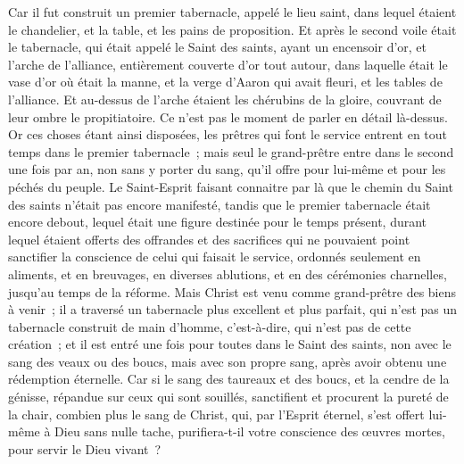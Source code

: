 \begin{multicols}{2}
Car il fut construit un premier tabernacle, appelé le lieu saint, dans lequel étaient le chandelier, et la table, et les pains de proposition.
Et après le second voile était le tabernacle, qui était appelé le Saint des saints,
ayant un encensoir d'or, et l'arche de l'alliance, entièrement couverte d'or tout autour, dans laquelle était le vase d'or où était la manne, et la verge d'Aaron qui avait fleuri, et les tables de l'alliance.
Et au-dessus de l'arche étaient les chérubins de la gloire, couvrant de leur ombre le propitiatoire. Ce n'est pas le moment de parler en détail là-dessus.
Or ces choses étant ainsi disposées, les prêtres qui font le service entrent en tout temps dans le premier tabernacle~;
mais seul le grand-prêtre entre dans le second une fois par an, non sans y porter du sang, qu'il offre pour lui-même et pour les péchés du peuple.
Le Saint-Esprit faisant connaitre par là que le chemin du Saint des saints n'était pas encore manifesté, tandis que le premier tabernacle était encore debout,
lequel était une figure destinée pour le temps présent, durant lequel étaient offerts des offrandes et des sacrifices qui ne pouvaient point sanctifier la conscience de celui qui faisait le service,
ordonnés seulement en aliments, et en breuvages, en diverses ablutions, et en des cérémonies charnelles, jusqu'au temps de la réforme.
Mais Christ est venu comme grand-prêtre des biens à venir~; il a traversé un tabernacle plus excellent et plus parfait, qui n'est pas un tabernacle construit de main d'homme, c'est-à-dire, qui n'est pas de cette création~;
et il est entré une fois pour toutes dans le Saint des saints, non avec le sang des veaux ou des boucs, mais avec son propre sang, après avoir obtenu une rédemption éternelle.
Car si le sang des taureaux et des boucs, et la cendre de la génisse, répandue sur ceux qui sont souillés, sanctifient et procurent la pureté de la chair,
combien plus le sang de Christ, qui, par l'Esprit éternel, s'est offert lui-même à Dieu sans nulle tache, purifiera-t-il votre conscience des œuvres mortes, pour servir le Dieu vivant~?

\end{multicols}
